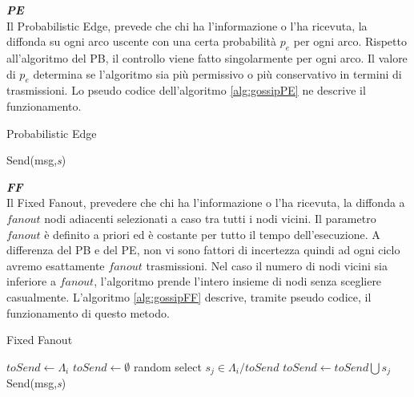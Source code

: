 \noindent\textbf{\textit{\acf{PE}}}\\
Il Probabilistic Edge, prevede che chi ha l'informazione o l'ha ricevuta, la diffonda su ogni arco uscente con una certa probabilità $\mathit{p_e}$ per ogni arco. Rispetto all'algoritmo del \acs{PB}, il controllo viene fatto singolarmente per ogni arco. Il valore di $\mathit{p_e}$ determina se l'algoritmo sia più permissivo o più conservativo in termini di trasmissioni. Lo pseudo codice dell'algoritmo \ref{alg:gossipPE} ne descrive il funzionamento.
\bigskip
\begin{algorithm}[h]
	\caption{Probabilistic Edge}\label{alg:gossipPE}
	\begin{algorithmic}[1]
					\State Send(msg,\emph{s})
				\EndIf
			\EndFor
		\EndFunction
	\end{algorithmic}
\end{algorithm}
\bigskip

\noindent\textbf{\textit{\acf{FF}}}\\
Il Fixed Fanout, prevedere che chi ha l'informazione o l'ha ricevuta, la diffonda a $\mathit{fanout}$ nodi adiacenti selezionati a caso tra tutti i nodi vicini. Il parametro $\mathit{fanout}$ è definito a priori ed è costante per tutto il tempo dell'esecuzione. A differenza del \acs{PB} e del \acs{PE}, non vi sono fattori di incertezza quindi ad ogni ciclo avremo esattamente $\mathit{fanout}$ trasmissioni. Nel caso il numero di nodi vicini sia inferiore a $\mathit{fanout}$, l'algoritmo prende l'intero insieme di nodi senza scegliere casualmente. L'algoritmo \ref{alg:gossipFF} descrive, tramite pseudo codice, il funzionamento di questo metodo.
\bigskip
\begin{algorithm}[h]
	\caption{Fixed Fanout}\label{alg:gossipFF}
	\begin{algorithmic}[1]
				\State $ \textit{toSend} \gets \Lambda_i $
			\Else
				\State $ \textit{toSend} \gets \emptyset $
					\State random select $ \textit{s}_\textit{j} \in \Lambda_{i}/\textit{toSend} $
					\State $ \textit{toSend} \gets \textit{toSend}\bigcup \textit{s}_\textit{j}$
				\EndFor
			\EndIf
				\State Send(msg,\emph{s})
			\EndFor
		\EndFunction
	\end{algorithmic}
\end{algorithm}
\bigskip



